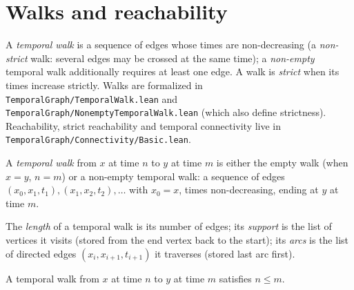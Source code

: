 \chapter{Walks and reachability}
\label{chap:walks}

A \emph{temporal walk} is a sequence of edges whose times are
non-decreasing (a \emph{non-strict} walk: several edges may be crossed at the
same time); a \emph{non-empty} temporal walk additionally requires at
least one edge. A walk is \emph{strict} when its times increase strictly.
Walks are formalized in \texttt{TemporalGraph/TemporalWalk.lean} and
\texttt{TemporalGraph/NonemptyTemporalWalk.lean} (which also define strictness).
Reachability, strict reachability and temporal connectivity live in
\texttt{TemporalGraph/Connectivity/Basic.lean}.

\begin{definition}
  \label{def:temporal-walk}
  \leanok
  A \emph{temporal walk} from $x$ at time $n$ to $y$ at time $m$ is either
  the empty walk (when $x = y$, $n = m$) or a non-empty temporal walk: a
  sequence of edges $(x_0,x_1,t_1), (x_1,x_2,t_2), \dots$ with
  $x_0 = x$, times non-decreasing, ending at $y$ at time $m$.
\end{definition}

\begin{definition}
  \label{def:walk-invariants}
  \leanok
  The \emph{length} of a temporal walk is its number of edges; its
  \emph{support} is the list of vertices it visits (stored from the end vertex back to the start); its
  \emph{arcs} is the list of directed edges $(x_i, x_{i+1}, t_{i+1})$ it
  traverses (stored last arc first).
\end{definition}

\begin{lemma}
  \label{lem:nondecreasing-time}
  \leanok
  A temporal walk from $x$ at time $n$ to $y$ at time $m$ satisfies
  $n \le m$.
\end{lemma}


